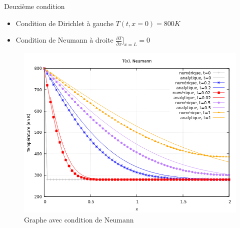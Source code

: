 \documentclass{beamer}
\begin{document}
\begin{frame}{Deuxième condition}
    \begin{itemize}
        \item Condition de Dirichlet à gauche $ T(t, x=0) = 800K$
        \item Condition de Neumann à droite $
            \frac{\partial T}{\partial x}]_{x=L} = 0$
        
    \end{itemize}
    \begin{figure}
        \centering
        \includegraphics[width=0.75\linewidth]{images/graphe_temperature_Neumann_1.png}
        \caption{Graphe avec condition de Neumann}
    \end{figure}
\end{frame}
\end{document}
